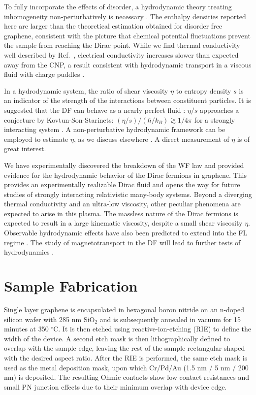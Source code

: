 To fully incorporate the effects of disorder, a hydrodynamic theory treating inhomogeneity non-perturbatively is necessary \cite{lucas_hydrodynamic_2015, lucas_transport_2016}. The enthalpy densities reported here are larger than the theoretical estimation obtained for disorder free graphene, consistent with the picture that chemical potential fluctuations prevent the sample from reaching the Dirac point. 
While we find thermal conductivity well described by Ref.~\cite{muller_quantum-critical_2008, foster_slow_2009}, electrical conductivity increases slower than expected away from the CNP, a result consistent with hydrodynamic transport in a viscous fluid with charge puddles \cite{lucas_transport_2016}. 

In a hydrodynamic system, the ratio of shear viscosity $\eta$ to entropy density $s$ is an indicator of the strength of the interactions between constituent particles.   It is suggested that the DF can behave as a nearly perfect fluid \cite{muller_graphene:_2009}: $\eta/s$ approaches a conjecture by Kovtun-Son-Starinets: $(\eta/s)/(\hbar/k_B) \gtrsim 1/4\pi$ for a strongly interacting system \cite{kovtun_viscosity_2005}.  A non-perturbative hydrodynamic framework can be employed to estimate $\eta$, as we discuss elsewhere \cite{lucas_transport_2016}.   A direct measurement of $\eta$ is of great interest. 


We have experimentally discovered the breakdown of the WF law and provided evidence for the hydrodynamic behavior of the Dirac fermions in graphene. This provides an experimentally realizable Dirac fluid and opens the way for future studies of strongly interacting relativistic many-body systems. Beyond a diverging thermal conductivity and an ultra-low viscosity, other peculiar phenomena are expected to arise in this plasma. The massless nature of the Dirac fermions is expected to result in a large kinematic viscosity, despite a small shear viscosity $\eta$.  Observable hydrodynamic effects have also been predicted to extend into the FL regime \cite{principi_bulk_2015}.  The study of magnetotransport in the DF will lead to further tests of hydrodynamics \cite{muller_quantum-critical_2008, hartnoll_theory_2007}.


\section{Sample Fabrication}
Single layer graphene is encapsulated in hexagonal boron nitride on an n-doped silicon wafer with 285 nm SiO$_2$ \cite{wang_one-dimensional_2013} and is subsequently annealed in vacuum for 15 minutes at 350 $^\circ$C. It is then etched using reactive-ion-etching (RIE) to define the width of the device. A second etch mask is then lithographically defined to overlap with the sample edge, leaving the rest of the sample rectangular shaped with the desired aspect ratio. After the RIE is performed, the same etch mask is used as the metal deposition mask, upon which Cr/Pd/Au (1.5 nm / 5 nm / 200 nm) is deposited. The resulting Ohmic contacts show low contact resistances and small PN junction effects due to their minimum overlap with device edge. 


